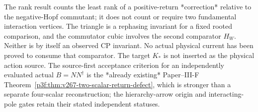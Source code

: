 \documentclass[12pt,a4paper]{article}
\begin{document}
\begin{remark}
\label{p5:rem:v3218-two-contact-source-scope}
The rank result counts the least rank of a positive-return *correction*
relative to the negative-Hopf commutant; it does not count or require two
fundamental interaction vertices.  The triangle is a rephasing
invariant for a fixed rooted comparison, and the commutator cubic
involves the second comparator $H_W$.  Neither is by itself an
observed CP invariant.  No actual physical current has been proved to
consume that comparator.  The target $K_*$ is not inserted as the
physical action source.  The source-first acceptance criterion for an
independently evaluated actual $B=NN^\dagger$ is the *already existing*
Paper--III-F Theorem~\ref{p3f:thm:v267-two-scalar-return-defect},
which is stronger than a separate four-scalar reconstruction; the
hierarchy-arrow origin and interacting-pole gates retain their stated
independent statuses.
\end{remark}

\end{document}
